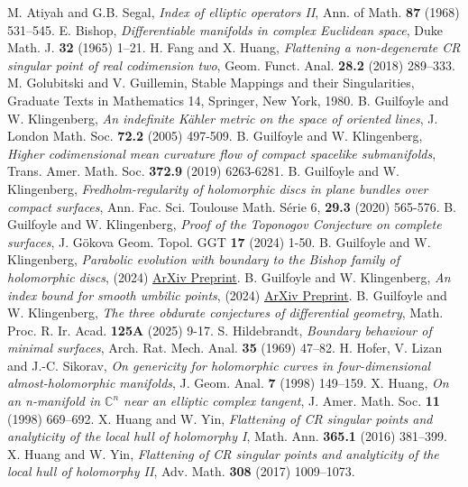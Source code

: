 \documentclass{amsart}
\begin{document}
\begin{thebibliography}{}
 M. Atiyah and G.B. Segal, {\em Index of elliptic operators II}, Ann. of Math. \textbf{87} (1968) 531--545.
 E. Bishop, {\em Differentiable manifolds in complex Euclidean space}, Duke Math. J. \textbf{32} (1965) 1--21.
 H. Fang and X. Huang, {\it Flattening a non-degenerate CR singular point of real codimension two},  Geom. Funct. Anal. \textbf{28.2} (2018) 289--333.
 M. Golubitski and V. Guillemin,  { Stable Mappings and their Singularities}, Graduate Texts in Mathematics 14, Springer, New York, 1980.
 B. Guilfoyle and W. Klingenberg, {\it An indefinite K\"ahler metric on the space of oriented lines}, J. London Math. Soc. {\bf 72.2} (2005) 497-509.
 B. Guilfoyle and W. Klingenberg, {\it Higher codimensional mean curvature flow of compact spacelike submanifolds}, Trans. Amer. Math. Soc. {\bf 372.9} (2019) 6263-6281. 
 B. Guilfoyle and W. Klingenberg, {\it Fredholm-regularity of holomorphic discs in plane bundles over compact surfaces}, Ann. Fac. Sci. Toulouse Math. S\'erie 6, {\bf 29.3} (2020) 565-576. 
 B. Guilfoyle and W. Klingenberg, {\it Proof of the Toponogov Conjecture on complete surfaces}, J. G\"okova Geom. Topol. GGT {\bf 17} (2024) 1-50. 
 B. Guilfoyle and W. Klingenberg, {\it Parabolic evolution with boundary to the Bishop family of holomorphic discs}, (2024) \href{https://arxiv.org/abs/2304.05702}{ArXiv Preprint}.
 B. Guilfoyle and W. Klingenberg, {\it An index bound for smooth umbilic points}, (2024) \href{https://arxiv.org/abs/1207.5994}{ArXiv Preprint}.
 B. Guilfoyle and W. Klingenberg, {\it The three obdurate conjectures of differential geometry}, Math. Proc. R. Ir. Acad. {\bf 125A} (2025) 9-17.
 S. Hildebrandt, {\em Boundary behaviour of minimal surfaces}, Arch. Rat. Mech. Anal. \textbf{35} (1969) 47--82.
 H. Hofer, V. Lizan and J.-C. Sikorav, {\em On genericity for holomorphic curves in four-dimensional almost-holomorphic manifolds}, J. Geom. Anal. \textbf{7} (1998) 149--159.
 X. Huang, {\em On an n-manifold in ${\mathbb{C}}^n$ near an  elliptic complex tangent},  J. Amer. Math. Soc. \textbf{11} (1998) 669--692.
  X. Huang and W. Yin, {\it Flattening of CR singular points and analyticity of the local hull of holomorphy I}, Math. Ann. \textbf{365.1} (2016) 381--399.
 X. Huang and W. Yin, {\it Flattening of CR singular points and analyticity of the local hull of holomorphy II}, Adv. Math. \textbf{308} (2017) 1009--1073.

\end{thebibliography}
\end{document}
